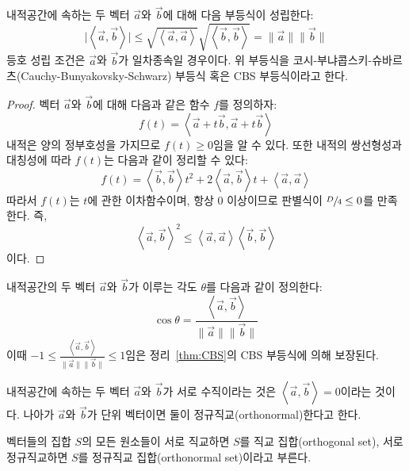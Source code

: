 \documentclass[../engineering_mathematics_lecture_note.tex]{subfiles}
\begin{document}
\begin{theorem}  \label{thm:CBS}
    내적공간에 속하는 두 벡터 $\vec a$와 $\vec b$에 대해 다음 부등식이 성립한다:
    \begin{equation*}
        \bigl|\left<\vec a, \vec b\right>\bigr| \leq \sqrt{\left<\vec a, \vec a\right>} \sqrt{\left<\vec b, \vec b\right>} = \lVert \vec a \rVert \lVert \vec b \rVert
    \end{equation*}
    등호 성립 조건은 $\vec a$와 $\vec b$가 일차종속일 경우이다.
    위 부등식을 코시-부냐콥스키-슈바르츠(Cauchy-Bunyakovsky-Schwarz) 부등식 혹은 CBS 부등식이라고 한다.
\end{theorem}

\begin{proof}
    벡터 $\vec a$와 $\vec b$에 대해 다음과 같은 함수 $f$를 정의하자:
    \begin{equation*}
        f(t) = \left<\vec a + t \vec b, \vec a + t \vec b\right>
    \end{equation*}
    내적은 양의 정부호성을 가지므로 $f(t) \geq 0$임을 알 수 있다.
    또한 내적의 쌍선형성과 대칭성에 따라 $f(t)$는 다음과 같이 정리할 수 있다:
    \begin{equation*}
        f(t) = \left<\vec b, \vec b\right> t^2 + 2 \left<\vec a, \vec b\right> t + \left<\vec a, \vec a\right>
    \end{equation*}
    따라서 $f(t)$는 $t$에 관한 이차함수이며, 항상 0 이상이므로 판별식이 $\sfrac D4 \leq 0$를 만족한다.
    즉,
    \begin{equation*}
       \left<\vec a, \vec b\right>^2 \leq \left<\vec a, \vec a\right> \left<\vec b, \vec b\right>
    \end{equation*}
    이다.
\end{proof}

\begin{definition}
    내적공간의 두 벡터 $\vec a$와 $\vec b$가 이루는 각도 $\theta$를 다음과 같이 정의한다:
    \begin{equation*}
        \cos \theta = \frac{\left<\vec a, \vec b\right>}{\lVert \vec a\rVert \lVert \vec b \rVert}
    \end{equation*}
    이때 $-1 \leq \frac{\left<\vec a, \vec b\right>}{\lVert \vec a\rVert \lVert \vec b \rVert} \leq 1$임은 정리~\ref{thm:CBS}의 CBS 부등식에 의해 보장된다.
\end{definition}

\begin{definition}
    내적공간에 속하는 두 벡터 $\vec a$와 $\vec b$가 서로 수직이라는 것은 $\left<\vec a, \vec b\right> = 0$이라는 것이다.
    나아가 $\vec a$와 $\vec b$가 단위 벡터이면 둘이 정규직교(orthonormal)한다고 한다.

    벡터들의 집합 $S$의 모든 원소들이 서로 직교하면 $S$를 직교 집합(orthogonal set), 서로 정규직교하면 $S$를 정규직교 집합(orthonormal set)이라고 부른다.
\end{definition}
\end{document}
